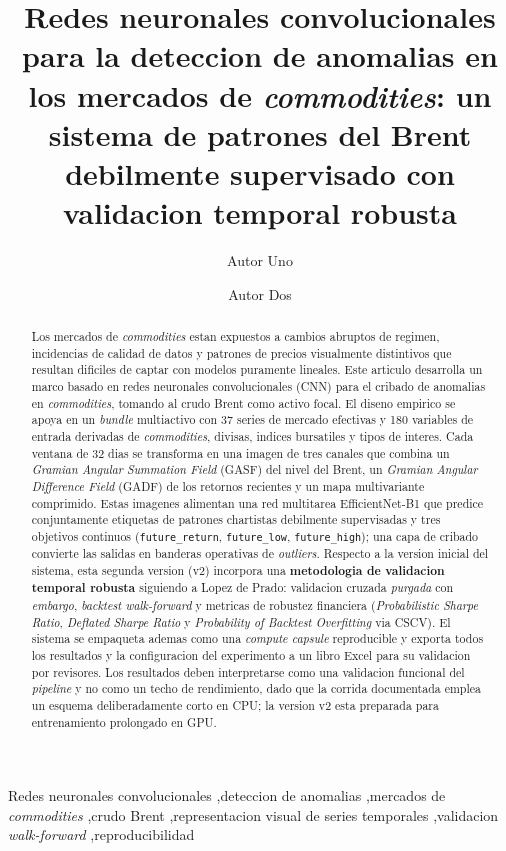 \documentclass[preprint,12pt,3p]{elsarticle}
\begin{document}
\begin{frontmatter}

\title{Redes neuronales convolucionales para la deteccion de anomalias en los
mercados de \emph{commodities}: un sistema de patrones del Brent debilmente
supervisado con validacion temporal robusta}

\author[a]{Autor Uno}
\author[b]{Autor Dos}
\address[a]{Afiliacion 1}
\address[b]{Afiliacion 2}

\begin{abstract}
Los mercados de \emph{commodities} estan expuestos a cambios abruptos de
regimen, incidencias de calidad de datos y patrones de precios visualmente
distintivos que resultan dificiles de captar con modelos puramente lineales.
Este articulo desarrolla un marco basado en redes neuronales convolucionales
(CNN) para el cribado de anomalias en \emph{commodities}, tomando al crudo Brent
como activo focal. El diseno empirico se apoya en un \emph{bundle} multiactivo
con 37 series de mercado efectivas y 180 variables de entrada derivadas de
\emph{commodities}, divisas, indices bursatiles y tipos de interes. Cada ventana
de 32 dias se transforma en una imagen de tres canales que combina un
\emph{Gramian Angular Summation Field} (GASF) del nivel del Brent, un
\emph{Gramian Angular Difference Field} (GADF) de los retornos recientes y un
mapa multivariante comprimido. Estas imagenes alimentan una red multitarea
EfficientNet-B1 que predice conjuntamente etiquetas de patrones chartistas
debilmente supervisadas y tres objetivos continuos (\texttt{future\_return},
\texttt{future\_low}, \texttt{future\_high}); una capa de cribado convierte las
salidas en banderas operativas de \emph{outliers}. Respecto a la version inicial
del sistema, esta segunda version (v2) incorpora una \textbf{metodologia de
validacion temporal robusta} siguiendo a Lopez de Prado: validacion cruzada
\emph{purgada} con \emph{embargo}, \emph{backtest walk-forward} y metricas de
robustez financiera (\emph{Probabilistic Sharpe Ratio}, \emph{Deflated Sharpe
Ratio} y \emph{Probability of Backtest Overfitting} via CSCV). El sistema se
empaqueta ademas como una \emph{compute capsule} reproducible y exporta todos los
resultados y la configuracion del experimento a un libro Excel para su validacion
por revisores. Los resultados deben interpretarse como una validacion funcional
del \emph{pipeline} y no como un techo de rendimiento, dado que la corrida
documentada emplea un esquema deliberadamente corto en CPU; la version v2 esta
preparada para entrenamiento prolongado en GPU.
\end{abstract}

\begin{keyword}
Redes neuronales convolucionales \sep deteccion de anomalias \sep mercados de
\emph{commodities} \sep crudo Brent \sep representacion visual de series
temporales \sep validacion \emph{walk-forward} \sep reproducibilidad
\end{keyword}

\end{frontmatter}
\end{document}

